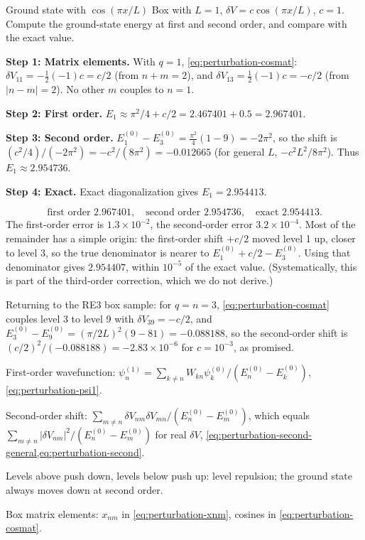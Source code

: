 \begin{sample}{Ground state with $\cos(\pi x/L)$}
Box with $L=1$, $\delta V=c\cos(\pi x/L)$, $c=1$. Compute the ground-state energy at first and second order, and compare with the exact value.

\textbf{Step 1: Matrix elements.} With $q=1$, \cref{eq:perturbation-cosmat}: $\delta V_{11}=-\tfrac12(-1)c=c/2$ (from $n+m=2$), and $\delta V_{13}=\tfrac12(-1)c=-c/2$ (from $|n-m|=2$). No other $m$ couples to $n=1$.

\textbf{Step 2: First order.} $E_1\approx\pi^2/4+c/2=2.467401+0.5=2.967401$.

\textbf{Step 3: Second order.} $E_1^{(0)}-E_3^{(0)}=\tfrac{\pi^2}{4}(1-9)=-2\pi^2$, so the shift is $(c^2/4)/(-2\pi^2)=-c^2/(8\pi^2)=-0.012665$ (for general $L$, $-c^2L^2/8\pi^2$). Thus $E_1\approx2.954736$.

\textbf{Step 4: Exact.} Exact diagonalization gives $E_1=2.954413$.

\[
\boxed{\text{first order }2.967401,\quad\text{second order }2.954736,\quad\text{exact }2.954413.}
\]
The first-order error is $1.3\times10^{-2}$, the second-order error $3.2\times10^{-4}$. Most of the remainder has a simple origin: the first-order shift $+c/2$ moved level 1 up, closer to level 3, so the true denominator is nearer to $E_1^{(0)}+c/2-E_3^{(0)}$. Using that denominator gives $2.954407$, within $10^{-5}$ of the exact value. (Systematically, this is part of the third-order correction, which we do not derive.)
\end{sample}

Returning to the RE3 box sample: for $q=n=3$, \cref{eq:perturbation-cosmat} couples level 3 to level 9 with $\delta V_{39}=-c/2$, and $E_3^{(0)}-E_9^{(0)}=(\pi/2L)^2(9-81)=-0.088188$, so the second-order shift is $(c/2)^2/(-0.088188)=-2.83\times10^{-6}$ for $c=10^{-3}$, as promised.

\begin{keyideas}
\item First-order wavefunction: $\psi_n^{(1)}=\sum_{k\ne n}W_{kn}\psi_k^{(0)}/(E_n^{(0)}-E_k^{(0)})$, \cref{eq:perturbation-psi1}.
\item Second-order shift: $\sum_{m\ne n}\delta V_{nm}\delta V_{mn}/(E_n^{(0)}-E_m^{(0)})$, which equals $\sum_{m\ne n}|\delta V_{nm}|^2/(E_n^{(0)}-E_m^{(0)})$ for real $\delta V$, \cref{eq:perturbation-second-general,eq:perturbation-second}.
\item Levels above push down, levels below push up: level repulsion; the ground state always moves down at second order.
\item Box matrix elements: $x_{nm}$ in \cref{eq:perturbation-xnm}, cosines in \cref{eq:perturbation-cosmat}.
\end{keyideas}

